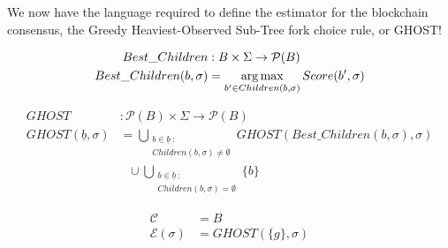 We now have the language required to define the estimator for the blockchain consensus, the Greedy Heaviest-Observed Sub-Tree fork choice rule, or GHOST!

\begin{defn}
\begin{align*}
Best\_Children&: B \times \Sigma \to \mathcal{P}(B)\\
Best\_Children(b,\sigma) &= \operatorname*{arg\,max}\limits_{b' \in Children(b, \sigma)} Score(b', \sigma)
\end{align*}
\end{defn}

\begin{defn}
\begin{align*}
GHOST&: \mathcal{P}(B) \times \Sigma \to \mathcal{P}(B)\\
GHOST(\underline{b},\sigma) &= \bigcup\limits_{\substack{b \in \underline{b} ~:\\ Children(b, \sigma) \neq \emptyset}} GHOST(Best\_Children(b,\sigma), \sigma) \\
&~~~\cup \bigcup\limits_{\substack{b \in \underline{b} ~:\\ Children(b, \sigma) = \emptyset}} \{b\}
\end{align*}
\end{defn}


\begin{defn}
\begin{align*}
\mathcal{C} &= B \\
\mathcal{E}(\sigma) &= GHOST(\{g\}, \sigma)
\end{align*}
\end{defn}

\iffalse
We can define GHOST differently.

\begin{defn}
\begin{align*}
Chain&: B \to \mathcal{P}(B)\\
Chain(g) &= \{\} \\
Chain(b) &= \{b\} \cup Chain(Prev(b))
\end{align*}
\end{defn}

\begin{defn}
\begin{align*}
GHOST&: \Sigma \to \mathcal{P}(B)\\
GHOST(\sigma) &= \{b \in \sigma : Children(b, \sigma) = \emptyset \land \forall b' \in Chain(b), \forall b'' \in Children(Prev(b), \sigma), Score(b') \geq Score(b'')\}
\end{align*}
\end{defn}
\fi


